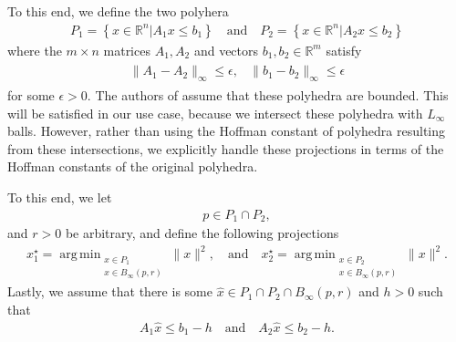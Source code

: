 \documentclass{article}
\newenvironment{comment}
  {\par\medskip
   \color{red}%
   \begin{framed}
   \textbf{Comment: }\ignorespaces}
 {\end{framed}
  \medskip}
\theoremstyle{case}
\numberwithin{theorem}{subsection}
\DeclareMathOperator*{\argmin}{arg\,min}
\newcommand{\bpr}{{B_{\infty}\left(p, r\right)}}
\newcommand{\Rm}{\mathbb R^m}
\newcommand{\Rn}{\mathbb R^n}
\begin{document}
To this end, we define the two polyhera
\begin{align}
\label{bap_define_the_polyhedra}
P_1 = \left\{ x \in \Rn | A_1x\le b_1 \right\}
\quad \textrm{and} \quad
P_2 = \left\{ x \in \Rn | A_2x\le b_2 \right\}
\end{align}
where the $m\times n$ matrices $A_1, A_2$ and vectors $b_1, b_2 \in \Rm$ satisfy
\begin{align}
\begin{array}{cc}
\|A_1 - A_2\|_{\infty} \le \epsilon, & \|b_1 - b_2\|_{\infty} \le \epsilon
\label{bap_polyhedra_are_close}
\end{array}
\end{align}
for some $\epsilon > 0$.
The authors of \cite{continuity_of_metric_projections} assume that these polyhedra are bounded.
This will be satisfied in our use case, because we intersect these polyhedra with $L_{\infty}$ balls.
However, rather than using the Hoffman constant of polyhedra resulting from these intersections,
we explicitly handle these projections in terms of the Hoffman constants of the original polyhedra.

% 
% 
% 

To this end, we let 
\begin{align}
p \in P_1\cap P_2,
\label{bap_define_ps}
\end{align} and $r>0$ be arbitrary, 
and define the following projections
\begin{align}
x_1^{\star} = \argmin_{
\substack{x\in P_1 \\ x \in \bpr }
}\|x\|^2, 
\quad \textrm{and} \quad
x_2^{\star} = \argmin_{
\substack{x\in P_2 \\ x \in \bpr }
}\|x\|^2.
\label{bap_define_the_projections}
\end{align}
Lastly, we assume that there is some $\hat x \in P_1 \cap P_2 \cap \bpr$ and $h > 0$ such that 
\begin{align}
\label{bap_feasible_by_h}
A_1 \hat x \le b_1 - h
\quad \textrm{and} \quad
A_2 \hat x \le b_2 - h.
\end{align}
\end{document}
